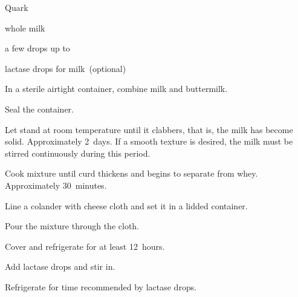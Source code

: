 \begin{recipe}{Quark}{}{}

\begin{ingredients}
\item {} whole milk
\item a few drops up to \C{\half} 
\item lactase drops for  milk~(optional)
\end{ingredients}

\begin{directions}
\item In a sterile airtight container, combine milk and buttermilk.
\item Seal the container.
\item Let stand at room temperature until it clabbers, that is, the milk has become solid. Approximately 2~days. If a smooth texture is desired, the milk must be stirred continuously during this period.
\item Cook mixture until curd thickens and begins to separate from whey. Approximately 30~minutes.
\item Line a colander with cheese cloth and set it in a lidded container.
\item Pour the mixture through the cloth.
\item Cover and refrigerate for at least 12~hours.
\item Add lactase drops and stir in.
\item Refrigerate for time recommended by lactase drops.
\end{directions}
\end{recipe}
